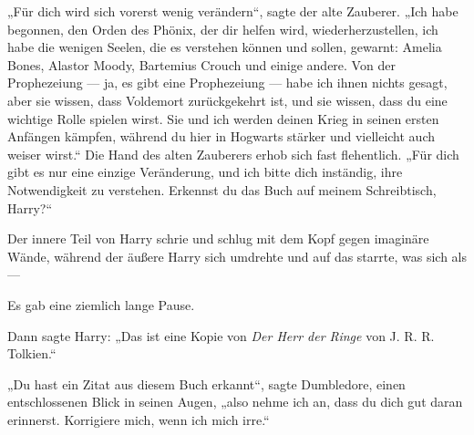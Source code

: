 „Für dich wird sich vorerst wenig verändern“, sagte der alte Zauberer.
„Ich habe begonnen, den Orden des Phönix, der dir helfen wird, wiederherzustellen, ich habe die wenigen Seelen, die es verstehen können und sollen, gewarnt: Amelia Bones, Alastor Moody, Bartemius Crouch und einige andere. Von der Prophezeiung — ja, es gibt eine Prophezeiung — habe ich ihnen nichts gesagt, aber sie wissen, dass Voldemort zurückgekehrt ist, und sie wissen, dass du eine wichtige Rolle spielen wirst. Sie und ich werden deinen Krieg in seinen ersten Anfängen kämpfen, während du hier in Hogwarts stärker und vielleicht auch weiser wirst.“ Die Hand des alten Zauberers erhob sich fast flehentlich.
„Für dich gibt es nur eine einzige Veränderung, und ich bitte dich inständig, ihre Notwendigkeit zu verstehen. Erkennst du das Buch auf meinem Schreibtisch, Harry?“

Der innere Teil von Harry schrie und schlug mit dem Kopf gegen imaginäre Wände, während der äußere Harry sich umdrehte und auf das starrte, was sich als —

Es gab eine ziemlich lange Pause.

Dann sagte Harry:
„Das ist eine Kopie von \emph{Der Herr der Ringe} von J. R. R. Tolkien.“

„Du hast ein Zitat aus diesem Buch erkannt“, sagte Dumbledore, einen entschlossenen Blick in seinen Augen, „also nehme ich an, dass du dich gut daran erinnerst. Korrigiere mich, wenn ich mich irre.“

